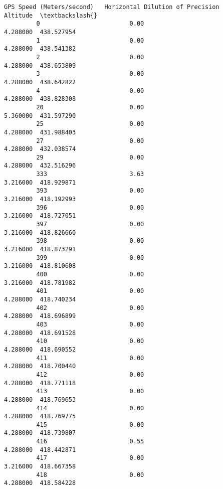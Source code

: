 \documentclass[11pt]{article}
\begin{document}
\begin{Verbatim}[commandchars=\\\{\}]
              GPS Speed (Meters/second)   Horizontal Dilution of Precision    Altitude  \textbackslash{}
         0                         0.00                           4.288000  438.527954   
         1                         0.00                           4.288000  438.541382   
         2                         0.00                           4.288000  438.653809   
         3                         0.00                           4.288000  438.642822   
         4                         0.00                           4.288000  438.828308   
         20                        0.00                           5.360000  431.597290   
         25                        0.00                           4.288000  431.988403   
         27                        0.00                           4.288000  432.038574   
         29                        0.00                           4.288000  432.516296   
         333                       3.63                           3.216000  418.929871   
         393                       0.00                           3.216000  418.192993   
         396                       0.00                           3.216000  418.727051   
         397                       0.00                           3.216000  418.826660   
         398                       0.00                           3.216000  418.873291   
         399                       0.00                           3.216000  418.810608   
         400                       0.00                           3.216000  418.781982   
         401                       0.00                           4.288000  418.740234   
         402                       0.00                           4.288000  418.696899   
         403                       0.00                           4.288000  418.691528   
         410                       0.00                           4.288000  418.690552   
         411                       0.00                           4.288000  418.700440   
         412                       0.00                           4.288000  418.771118   
         413                       0.00                           4.288000  418.769653   
         414                       0.00                           4.288000  418.769775   
         415                       0.00                           4.288000  418.739807   
         416                       0.55                           4.288000  418.442871   
         417                       0.00                           3.216000  418.667358   
         418                       0.00                           4.288000  418.584228   

\end{Verbatim}
\end{document}
